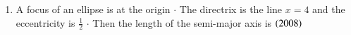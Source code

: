 \documentclass[journal,12pt,twocolumn]{IEEEtran}
\theoremstyle{remark}
\begin{document}
\begin{enumerate}
\begin{enumerate}
\end{enumerate}
\hfill
\item  A focus of an ellipse is at the origin {$ \cdot $} The directrix is the line {$ x = 4 $} and the eccentricity is {$ \frac{1}{2} $} {$ \cdot $} Then the length of the semi-major axis is 
\hfill
\hfill { $ \left(2008\right) $}
\begin{enumerate}
\end{enumerate}
\hfill
\end{enumerate}
\end{document}
